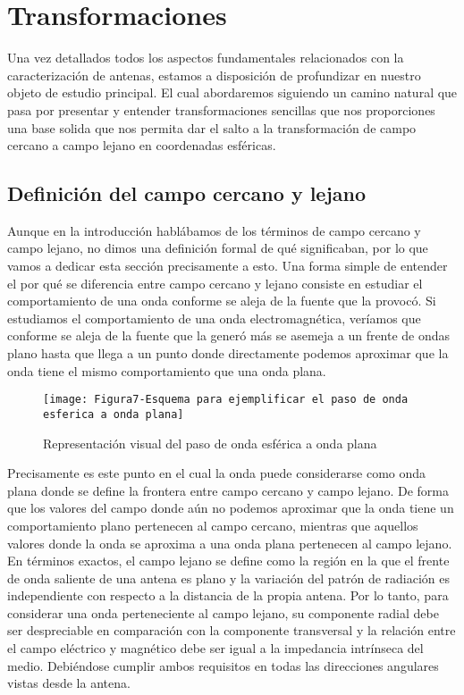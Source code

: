 \chapter{Transformaciones}
\label{cha:Transformaciones}

Una vez detallados todos los aspectos fundamentales relacionados con la caracterización de antenas, estamos a disposición de profundizar en nuestro objeto de estudio principal. El cual abordaremos siguiendo un camino natural que pasa por presentar y entender transformaciones sencillas que nos proporciones una base solida que nos permita dar el salto a la transformación de campo cercano a campo lejano en coordenadas esféricas.

\section{Definición del campo cercano y lejano}

Aunque en la introducción hablábamos de los términos de campo cercano y campo lejano, no dimos una definición formal de qué significaban, por lo que vamos a dedicar esta sección precisamente a esto. Una forma simple de entender el por qué se diferencia entre campo cercano y lejano consiste en estudiar el comportamiento de una onda conforme se aleja de la fuente que la provocó. Si estudiamos el comportamiento de una onda electromagnética, veríamos que conforme se aleja de la fuente que la generó más se asemeja a un frente de ondas plano hasta que llega a un punto donde directamente podemos aproximar que la onda tiene el mismo comportamiento que una onda plana.

\begin{figure}[h]
    \centering
    \texttt{[image: Figura7-Esquema para ejemplificar el paso de onda esferica a onda plana]}
    \caption{Representación visual del paso de onda esférica a onda plana}
    \label{Ejemplo-paso-onda-esferica-a-onda-plana}
\end{figure}

Precisamente es este punto en el cual la onda puede considerarse como onda plana donde se define la frontera entre campo cercano y campo lejano. De forma que los valores del campo donde aún no podemos aproximar que la onda tiene un comportamiento plano pertenecen al campo cercano, mientras que aquellos valores donde la onda se aproxima a una onda plana pertenecen al campo lejano.\\ 

En términos exactos, el campo lejano se define como la región en la que el frente de onda saliente de una antena es plano y la variación del patrón de radiación es independiente con respecto a la distancia de la propia antena. Por lo tanto, para considerar una onda perteneciente al campo lejano, su componente radial debe ser despreciable en comparación con la componente transversal y la relación entre el campo eléctrico y magnético debe ser igual a la impedancia intrínseca del medio. Debiéndose cumplir ambos requisitos en todas las direcciones angulares vistas desde la antena.
\\


